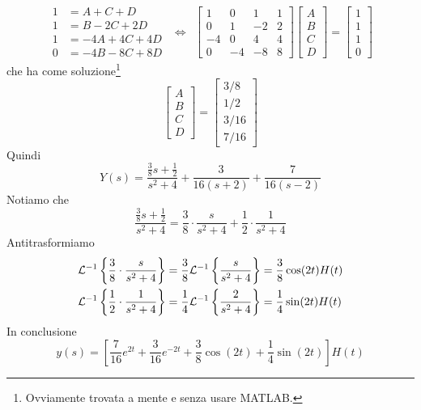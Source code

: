 \begin{equation*}
\begin{aligned}
1 & = A + C + D\\
1 & = B - 2C + 2D\\
1 & = - 4A + 4C + 4D\\
0 & = - 4B - 8C + 8D
\end{aligned} \ \ \iff \ \
\begin{bmatrix}
1 & 0 & 1 & 1\\
0 & 1 & - 2 & 2\\
- 4 & 0 & 4 & 4\\
0 & - 4 & - 8 & 8
\end{bmatrix}
\begin{bmatrix}
A\\
B\\
C\\
D
\end{bmatrix} =
\begin{bmatrix}
1\\
1\\
1\\
0
\end{bmatrix}
\end{equation*}
che ha come soluzione\footnote{Ovviamente trovata a mente e senza usare MATLAB.}
\begin{equation*}
\begin{bmatrix}
A\\
B\\
C\\
D
\end{bmatrix} =
\begin{bmatrix}
3/8\\
1/2\\
3/16\\
7/16
\end{bmatrix}
\end{equation*}
Quindi
\begin{equation*}
Y(s) = \frac{\frac{3}{8} s + \frac{1}{2}}{s^{2} + 4} + \frac{3}{16(s + 2)} + \frac{7}{16(s - 2)}
\end{equation*}
Notiamo che
\begin{equation*}
\frac{\frac{3}{8} s + \frac{1}{2}}{s^{2} + 4} = \frac{3}{8} \cdot \frac{s}{s^{2} + 4} + \frac{1}{2} \cdot \frac{1}{s^{2} + 4}
\end{equation*}
Antitrasformiamo
\begin{align*}
\mathcal{L}^{- 1}\left\{\frac{3}{8} \cdot \frac{s}{s^{2} + 4}\right\} & = \frac{3}{8}\mathcal{L}^{- 1}\left\{\frac{s}{s^{2} + 4}\right\} = \frac{3}{8}\cos(2t) H(t)\\
\mathcal{L}^{- 1}\left\{\frac{1}{2} \cdot \frac{1}{s^{2} + 4}\right\} & = \frac{1}{4}\mathcal{L}^{- 1}\left\{\frac{2}{s^{2} + 4}\right\} = \frac{1}{4}\sin(2t) H(t)
\end{align*}
In conclusione
\begin{equation*}
y(s) = \left[\frac{7}{16} e^{2t} + \frac{3}{16} e^{- 2t} + \frac{3}{8}\cos(2t) + \frac{1}{4}\sin(2t)\right] H(t)
\end{equation*}

